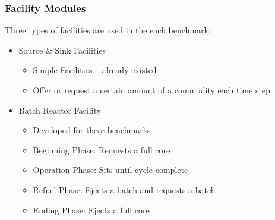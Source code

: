 \begin{frame}[ctb!]
  \frametitle{Facility Modules}
  Three types of facilities are used in the each benchmark:
  \begin{itemize}
    \item Source \& Sink Facilities
      \begin{itemize}
        \item Simple Facilities -- already existed
        \item Offer or request a certain amount of a commodity each time step
      \end{itemize}
    \item Batch Reactor Facility
      \begin{itemize}
        \item Developed for these benchmarks
        \item Beginning Phase: Requests a full core
        \item Operation Phase: Sits until cycle complete
        \item Refuel Phase: Ejects a batch and requests a batch
        \item Ending Phase: Ejects a full core
      \end{itemize}
  \end{itemize}
\end{frame}
